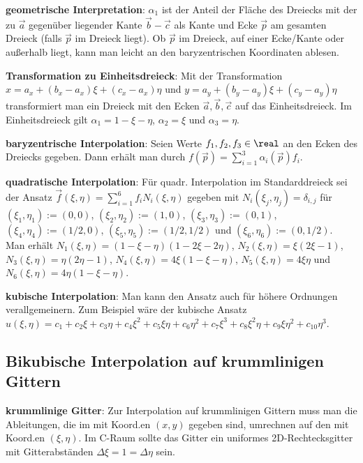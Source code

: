 \textbf{geometrische Interpretation}:
$\alpha_1$ ist der Anteil der Fläche des Dreiecks mit der zu $\vec{a}$ gegenüber liegender
Kante $\vec{b} - \vec{c}$ als Kante und Ecke $\vec{p}$ am gesamten Dreieck
(falls $\vec{p}$ im Dreieck liegt).
Ob $\vec{p}$ im Dreieck, auf einer Ecke/Kante oder außerhalb liegt, kann man leicht
an den baryzentrischen Koordinaten ablesen.

\textbf{Transformation zu Einheitsdreieck}:
Mit der Transformation $x = a_x + (b_x - a_x) \xi + (c_x - a_x)\eta$ und
$y = a_y + (b_y - a_y) \xi + (c_y - a_y)\eta$ transformiert man ein Dreieck mit den
Ecken $\vec{a}, \vec{b}, \vec{c}$ auf das Einheitsdreieck.
Im Einheitsdreieck gilt $\alpha_1 = 1 - \xi - \eta$, $\alpha_2 = \xi$ und $\alpha_3 = \eta$.

\textbf{baryzentrische Interpolation}:
Seien Werte $f_1, f_2, f_3 \in \real$ an den Ecken des Dreiecks gegeben.
Dann erhält man  durch
$f(\vec{p}) = \sum_{i=1}^3 \alpha_i(\vec{p}) f_i$.

\linie

\textbf{quadratische Interpolation}:
Für quadr. Interpolation im Standarddreieck
sei der Ansatz
$\vec{f}(\xi, \eta) = \sum_{i=1}^6 f_i N_i(\xi, \eta)$ gegeben
mit $N_i(\xi_j, \eta_j) = \delta_{i,j}$ für
$(\xi_1, \eta_1) := (0, 0)$,
$(\xi_2, \eta_2) := (1, 0)$,
$(\xi_3, \eta_3) := (0, 1)$,
$(\xi_4, \eta_4) := (1/2, 0)$,
$(\xi_5, \eta_5) := (1/2, 1/2)$ und
$(\xi_6, \eta_6) := (0, 1/2)$.\\
Man erhält
$N_1(\xi, \eta) = (1 - \xi - \eta) (1 - 2\xi - 2\eta)$,
$N_2(\xi, \eta) = \xi (2\xi - 1)$,
$N_3(\xi, \eta) = \eta (2\eta - 1)$,
$N_4(\xi, \eta) = 4\xi (1 - \xi - \eta)$,
$N_5(\xi, \eta) = 4\xi\eta$ und
$N_6(\xi, \eta) = 4\eta (1 - \xi - \eta)$.

\textbf{kubische Interpolation}:
Man kann den Ansatz auch für höhere Ordnungen verallgemeinern.
Zum Beispiel wäre der kubische Ansatz\\
$u(\xi, \eta) = c_1 + c_2\xi + c_3\eta + c_4\xi^2 + c_5\xi\eta + c_6\eta^2 + c_7\xi^3 +
c_8\xi^2\eta + c_9\xi\eta^2 + c_{10}\eta^3$.

\subsection{%
    Bikubische Interpolation auf krummlinigen Gittern%
}

\textbf{krummlinige Gitter}:
Zur Interpolation auf krummlinigen Gittern muss man die Ableitungen, die im
 mit Koord.en $(x, y)$ gegeben sind,
umrechnen auf den  mit Koord.en $(\xi, \eta)$.
Im C-Raum sollte das Gitter ein uniformes 2D-Rechtecksgitter mit Gitterabständen
$\Delta\xi = 1 = \Delta\eta$ sein.

